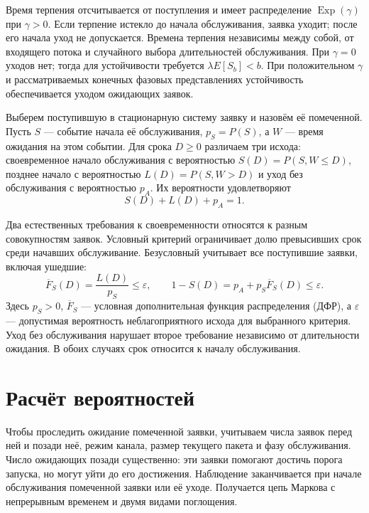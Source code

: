 Время терпения отсчитывается от поступления и имеет распределение $\operatorname{Exp}(\gamma)$ при $\gamma>0$. Если терпение истекло до начала обслуживания, заявка уходит; после его начала уход не допускается. Времена терпения независимы между собой, от входящего потока и случайного выбора длительностей обслуживания. При $\gamma=0$ уходов нет; тогда для устойчивости требуется $\lambda E[S_b]<b$. При положительном $\gamma$ и рассматриваемых конечных фазовых представлениях устойчивость обеспечивается уходом ожидающих заявок.

Выберем поступившую в стационарную систему заявку и назовём её помеченной. Пусть $S$ --- событие начала её обслуживания, $p_S=P(S)$, а $W$ --- время ожидания на этом событии. Для срока $D\geq0$ различаем три исхода: своевременное начало обслуживания с вероятностью $S(D)=P(S,W\leq D)$, позднее начало с вероятностью $L(D)=P(S,W>D)$ и уход без обслуживания с вероятностью $p_A$. Их вероятности удовлетворяют
\begin{equation}\label{eq:outcomes}
 S(D)+L(D)+p_A=1.
\end{equation}

Два естественных требования к своевременности относятся к разным совокупностям заявок. Условный критерий ограничивает долю превысивших срок среди начавших обслуживание. Безусловный учитывает все поступившие заявки, включая ушедшие:
\begin{equation}\label{eq:sla}
 \overline F_S(D)=\frac{L(D)}{p_S}\leq\varepsilon,
 \qquad 1-S(D)=p_A+p_S\overline F_S(D)\leq\varepsilon.
\end{equation}
Здесь $p_S>0$, $\overline F_S$ --- условная дополнительная функция распределения (ДФР), а $\varepsilon$ --- допустимая вероятность неблагоприятного исхода для выбранного критерия. Уход без обслуживания нарушает второе требование независимо от длительности ожидания. В обоих случаях срок относится к началу обслуживания.

\section*{Расчёт вероятностей}

Чтобы проследить ожидание помеченной заявки, учитываем числа заявок перед ней и позади неё, режим канала, размер текущего пакета и фазу обслуживания. Число ожидающих позади существенно: эти заявки помогают достичь порога запуска, но могут уйти до его достижения. Наблюдение заканчивается при начале обслуживания помеченной заявки или её уходе. Получается цепь Маркова с непрерывным временем и двумя видами поглощения.

